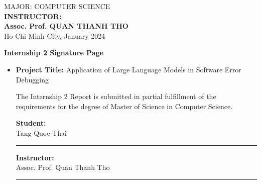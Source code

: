 \documentclass[a4paper,oneside]{book}
\begin{document}
\begin{titlepage}
    \begin{center}
        {\fontsize{14.4pt}{1} MAJOR: COMPUTER SCIENCE}\\[.2cm]
        {\fontsize{14.4pt}{1}
        \textbf{INSTRUCTOR:}\\[.2cm]
        \textbf{Assoc. Prof. QUAN THANH THO}\\[.2cm]
        {\fontsize{14.4pt}{1} Ho Chi Minh City, January 2024}}
    \end{center}
\end{titlepage}

\newpage
\begin{titlepage}
    \thispagestyle{empty}
    \begin{center}
        \begin{large}
            \textbf{Internship 2 Signature Page}
        \end{large}
    \end{center}
    \vspace{1.2cm}
    \begin{itemize}
        \item[] \textbf{Project Title:} Application of Large Language Models in Software Error Debugging
            \vspace{1cm}

            The Internship 2 Report is submitted in partial fulfillment of the requirements for the degree of Master of Science in Computer Science.
            \vspace{2cm}

            \begin{minipage}{0.5\textwidth}
                \textbf{Student:} \\[2cm]
                Tang Quoc Thai\\[0.25cm]
                \hrulefill
                \rule{7cm}{0.4pt}
            \end{minipage}
            \begin{minipage}{0.5\textwidth}
                \begin{flushright}
                    \textbf{Instructor:} \\[2cm]
                    Assoc. Prof. Quan Thanh Tho\\[0.25cm]
                    \hrulefill
                    \rule{7cm}{0.4pt}
                \end{flushright}
            \end{minipage}
            \vspace{1cm}
    \end{itemize}
\end{titlepage}
\end{document}
